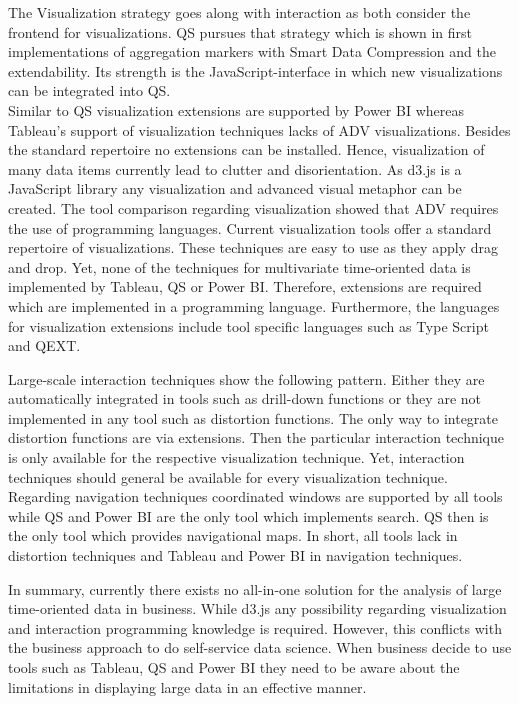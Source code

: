 The Visualization strategy goes along with interaction as both consider the frontend for visualizations. QS pursues that strategy which is shown in first implementations of aggregation markers with Smart Data Compression and the extendability. Its strength is the JavaScript-interface in which new visualizations can be integrated into QS. \\
Similar to QS visualization extensions are supported by Power BI whereas Tableau's support of visualization techniques lacks of ADV visualizations. Besides the standard repertoire no extensions can be installed. Hence, visualization of many data items currently lead to clutter and disorientation. As d3.js is a JavaScript library any visualization and advanced visual metaphor can be created.
The tool comparison regarding visualization showed that ADV requires the use of programming languages. Current visualization tools offer a standard repertoire of visualizations. These techniques are easy to use as they apply drag and drop. Yet, none of the techniques for multivariate time-oriented data is implemented by Tableau, QS or Power BI. Therefore, extensions are required which are implemented in a programming language. Furthermore, the languages for visualization extensions include tool specific languages such as Type Script and QEXT.\\
\par
Large-scale interaction techniques show the following pattern. Either they are automatically integrated in tools such as drill-down functions or they are not implemented in any tool such as distortion functions. The only way to integrate distortion functions are via extensions. Then the particular interaction technique is only available for the respective visualization technique. Yet, interaction techniques should general be available for every visualization technique.
Regarding navigation techniques coordinated windows are supported by all tools while QS and Power BI are the only tool which implements search. QS then is the only tool which provides navigational maps.
In short, all tools lack in distortion techniques and Tableau and Power BI in navigation techniques. 
\par
In summary, currently there exists no all-in-one solution for the analysis of large time-oriented data in business. While d3.js any possibility regarding visualization and  interaction programming knowledge is required. However, this conflicts with the business approach to do self-service data science. When business decide to use tools such as Tableau, QS and Power BI they need to be aware about the limitations in displaying large data in an effective manner. 




